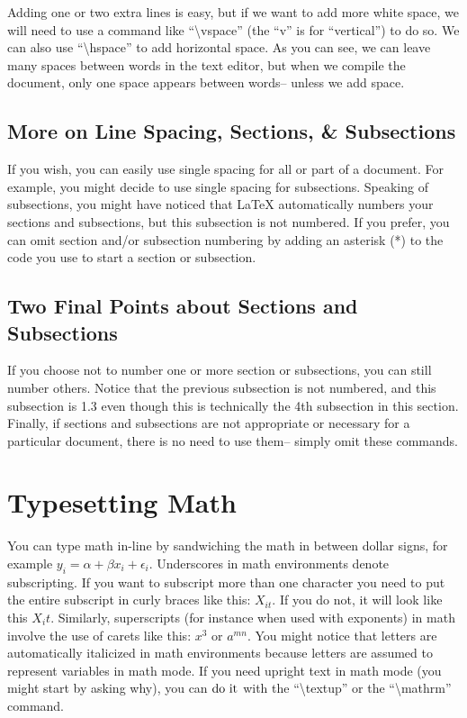 \documentclass[12pt,notitlepage]{article}		%
\begin{document}
Adding one or two extra lines is easy, but if we want to add more white space, we will need to use a command like ``\textbackslash vspace'' (the ``v'' is for ``vertical'') to do so.  We can also use ``\textbackslash hspace'' to add horizontal space.                As you can see, we can leave        many spaces between words in the text editor, but     when we compile the document, only one space appears between words-- unless we \hspace {10pt} add \hspace{10mm} space.


\subsection*{More on Line Spacing, Sections, \& Subsections}

\singlespacing

If you wish, you can easily use single spacing for all or part of a document.  For example, you might decide to use single spacing for subsections.  Speaking of subsections, you might have noticed that LaTeX automatically numbers your sections and subsections, but this subsection is not numbered.  If you prefer, you can omit section and/or subsection numbering by adding an asterisk (*) to the code you use to start a section or subsection.

\doublespacing

\subsection{Two Final Points about Sections and Subsections}

If you choose not to number one or more section or subsections, you can still number others.  Notice that the previous subsection is not numbered, and this subsection is 1.3 even though this is technically the 4th subsection in this section.  Finally, if sections and subsections are not appropriate or necessary for a particular document, there is no need to use them-- simply omit these commands.

\section{Typesetting Math}

You can type math in-line by sandwiching the math in between dollar signs, for example $y_i = \alpha + \beta x_i + \epsilon_i$. Underscores in math environments denote subscripting. If you want to subscript more than one character you need to put the entire subscript in curly braces like this: $X_{it}$. If you do not, it will look like this $X_it$. Similarly, superscripts (for instance when used with exponents) in math involve the use of carets like this: $x^3$ or $a^{mn}$.  You might notice that letters are automatically italicized in math environments because letters are assumed to represent variables in math mode.  If you need upright text in math mode (you might start by asking why), you can $\textup{do it}$ with the ``\textbackslash textup'' or the ``\textbackslash mathrm'' command.
\end{document}
